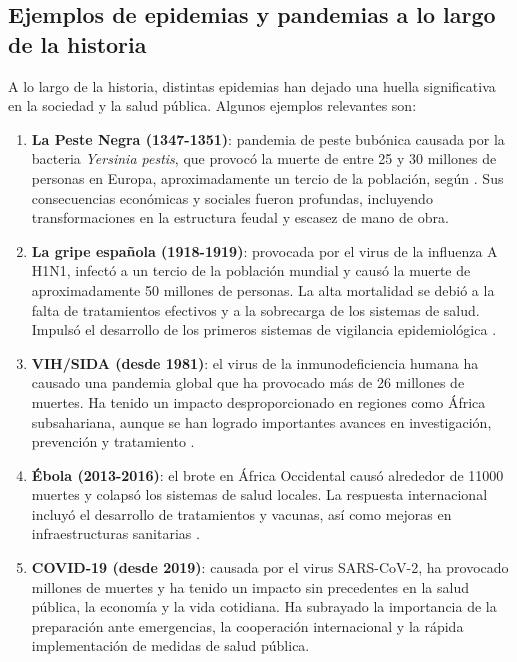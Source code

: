 \subsection{Ejemplos de epidemias y pandemias a lo largo de la historia}
A lo largo de la historia, distintas epidemias han dejado una huella significativa en la sociedad y la salud pública. Algunos ejemplos relevantes son:
\begin{enumerate}
    \item \textbf{La Peste Negra (1347-1351)}: pandemia de peste bubónica causada por la bacteria \textit{Yersinia pestis}, que provocó la muerte de entre 25 y 30 millones de personas en Europa, aproximadamente un tercio de la población, según \cite{patterson2021societal}. Sus consecuencias económicas y sociales fueron profundas, incluyendo transformaciones en la estructura feudal y escasez de mano de obra. 
    
    \item \textbf{La gripe española (1918-1919)}: provocada por el virus de la influenza A H1N1, infectó a un tercio de la población mundial y causó la muerte de aproximadamente 50 millones de personas. La alta mortalidad se debió a la falta de tratamientos efectivos y a la sobrecarga de los sistemas de salud. Impulsó el desarrollo de los primeros sistemas de vigilancia epidemiológica \cite{kilbourne2006influenza}.
    
  
    \item \textbf{VIH/SIDA (desde 1981)}: el virus de la inmunodeficiencia humana ha causado una pandemia global que ha provocado más de 26 millones de muertes. Ha tenido un impacto desproporcionado en regiones como África subsahariana, aunque se han logrado importantes avances en investigación, prevención y tratamiento \cite{miranda2022tale}.
    \item \textbf{Ébola (2013-2016)}: el brote en África Occidental causó alrededor de 11000 muertes y colapsó los sistemas de salud locales. La respuesta internacional incluyó el desarrollo de tratamientos y vacunas, así como mejoras en infraestructuras sanitarias \cite{who2014ebola}.
    \item \textbf{COVID-19 (desde 2019)}: causada por el virus SARS-CoV-2, ha provocado millones de muertes y ha tenido un impacto sin precedentes en la salud pública, la economía y la vida cotidiana. Ha subrayado la importancia de la preparación ante emergencias, la cooperación internacional y la rápida implementación de medidas de salud pública. 
    



\end{enumerate}
